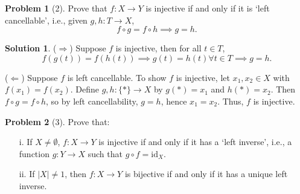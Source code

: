 \documentclass{article}
\theoremstyle{definition}
\newtheorem{problem}{Problem}
\newtheorem{solution}{Solution}
\begin{document}
\begin{problem}[2]
Prove that $f : X \longrightarrow Y$ is injective if and only if it is ‘left cancellable’, i.e., given $g, h : T \longrightarrow X$,
\[ f \circ g = f \circ h \implies g = h. \]
\end{problem}

\begin{solution}
($\Rightarrow$) Suppose $f$ is injective, then for all $t \in T$,
\[
	f(g(t)) = f(h(t)) \implies g(t) = h(t)  \forall t \in T \implies g = h.
\]


($\Leftarrow$) Suppose $f$ is left cancellable. To show $f$ is injective, let $x_1, x_2 \in X$ with $f(x_1) = f(x_2)$. Define $g, h : \{*\} \longrightarrow X$ by $g(*) = x_1$ and $h(*) = x_2$. Then $f \circ g = f \circ h$, so by left cancellability, $g = h$, hence $x_1 = x_2$. Thus, $f$ is injective.
\end{solution}

\begin{problem}[3]
Prove that:
\begin{enumerate}
    \item[i.] If $X \neq \emptyset$, $f : X \longrightarrow Y$ is injective if and only if it has a ‘left inverse’, i.e., a function $g : Y \longrightarrow X$ such that $g \circ f = \text{id}_X$.
    \item[ii.] If $|X| \neq 1$, then $f : X \longrightarrow Y$ is bijective if and only if it has a unique left inverse.
\end{enumerate}
\end{problem}
\end{document}
